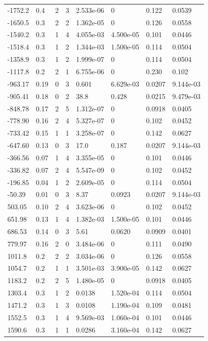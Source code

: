 \documentclass[preview]{standalone}
\begin{document}
{{\begin{tabular}{L{1.2cm}C{1.2cm} C{0.3cm}C{0.5cm} C{1.4cm}C{1.4cm} C{1.4cm}C{1.4cm}}
  -1752.2  &   0.4  & 2     &  3 &  2.533e-06  & 0  & 0.122 &  0.0539   \\ 
  -1650.5  &   0.3  & 2     &  2 &  1.362e-05  & 0  & 0.126 &  0.0558   \\ 
  -1540.2  &   0.3  & 1     &  4 &  4.055e-03  & 4.500e-05  & 0.101 &  0.0446   \\ 
  -1518.4  &   0.3  & 1     &  2 &  1.344e-03  & 1.500e-05  & 0.114 &  0.0504   \\ 
  -1358.9  &   0.3  & 1     &  2 &  1.999e-07  & 0  & 0.114 &  0.0504   \\ 
  -1117.8  &   0.2  & 2     &  1 &  6.755e-06  & 0  & 0.230 &  0.102   \\ 
  -963.17  &  0.19  & 0     &  3 &  0.601  & 6.629e-03  & 0.0207 &  9.144e-03   \\ 
  -905.41  &  0.18  & 0     &  2 &  38.8  & 0.428  & 0.0215 &  9.479e-03   \\ 
  -848.78  &  0.17  & 2     &  5 &  1.312e-07  & 0  & 0.0918 &  0.0405   \\ 
  -778.90  &  0.16  & 2     &  4 &  5.327e-07  & 0  & 0.102 &  0.0452   \\ 
  -733.42  &  0.15  & 1     &  1 &  3.258e-07  & 0  & 0.142 &  0.0627   \\ 
  -647.60  &  0.13  & 0     &  3 &  17.0  & 0.187  & 0.0207 &  9.144e-03   \\ 
  -366.56  &  0.07  & 1     &  4 &  3.355e-05  & 0  & 0.101 &  0.0446   \\ 
  -336.82  &  0.07  & 2     &  4 &  5.547e-09  & 0  & 0.102 &  0.0452   \\ 
  -196.85  &  0.04  & 1     &  2 &  2.609e-05  & 0  & 0.114 &  0.0504   \\ 
  -50.39  &  0.01  & 0     &  3 &  8.37  & 0.0923  & 0.0207 &  9.144e-03   \\ 
  503.05  &  0.10  & 2     &  4 &  3.623e-06  & 0  & 0.102 &  0.0452   \\ 
  651.98  &  0.13  & 1     &  4 &  1.382e-03  & 1.500e-05  & 0.101 &  0.0446   \\ 
  686.53  &  0.14  & 0     &  3 &  5.61  & 0.0620  & 0.0909 &  0.0401   \\ 
  779.97  &  0.16  & 2     &  0 &  3.484e-06  & 0  & 0.111 &  0.0490   \\ 
  1011.8  &   0.2  & 2     &  2 &  3.034e-06  & 0  & 0.126 &  0.0558   \\ 
  1054.7  &   0.2  & 1     &  1 &  3.501e-03  & 3.900e-05  & 0.142 &  0.0627   \\ 
  1183.2  &   0.2  & 2     &  5 &  1.480e-05  & 0  & 0.0918 &  0.0405   \\ 
  1303.4  &   0.3  & 1     &  2 &  0.0138  & 1.520e-04  & 0.114 &  0.0504   \\ 
  1471.2  &   0.3  & 1     &  3 &  0.0108  & 1.190e-04  & 0.109 &  0.0481   \\ 
  1552.5  &   0.3  & 1     &  4 &  9.569e-03  & 1.060e-04  & 0.101 &  0.0446   \\ 
  1590.6  &   0.3  & 1     &  1 &  0.0286  & 3.160e-04  & 0.142 &  0.0627   \\ 
\hline 
\end{tabular} 

}}
\end{document}
